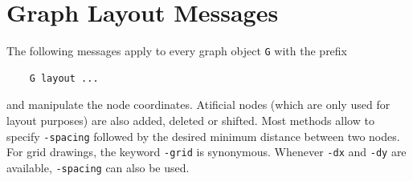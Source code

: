 \documentclass[a4paper,11pt,twoside]{book}
\begin{document}
\clearpage
{}
\section{Graph Layout Messages}
The following messages apply to every graph object \verb/G/ with the prefix
\begin{verbatim}
    G layout ...
\end{verbatim}
and manipulate the node coordinates. Atificial nodes (which are only used for
layout purposes) are also added, deleted or shifted. Most methods allow to
specify \verb/-spacing/ followed by the desired minimum distance between two
nodes. For grid drawings, the keyword \verb/-grid/ is synonymous. Whenever
\verb/-dx/ and \verb/-dy/ are available, \verb/-spacing/ can also be used.
\end{document}
